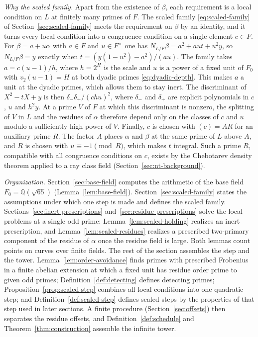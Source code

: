 \documentclass[11pt]{article}
\theoremstyle{plain}
\theoremstyle{definition}
\theoremstyle{remark}
\newcommand{\Q}{\mathbb Q}
\begin{document}
\emph{Why the scaled family.}  Apart from the existence of $\beta$, each
requirement is a local condition on $L$ at finitely many primes of $F$.  The
scaled family \eqref{eq:scaled-family} of Section~\ref{sec:scaled-family}
meets the requirement on $\beta$ by an identity, and it turns every local
condition into a congruence condition on a single element $c\in F$.  For
$\beta=a+u\alpha$ with $a\in F$ and $u\in F^\times$ one has
$N_{L/F}\beta=a^2+aut+u^2y$, so $N_{L/F}\beta=y$ exactly when
$t=(y(1-u^2)-a^2)/(au)$.  The family takes $a=c(u-1)/h$, where $h=2^H$ is
the scale and $u$ is a power of a fixed unit of $F_0$ with $v_2(u-1)=H$ at
both dyadic primes \eqref{eq:dyadic-depth}.  This makes $a$ a unit at the
dyadic primes, which allows them to stay inert.  The discriminant of
$X^2-tX+y$ is then $\delta_-\delta_+/(chu)^2$, where $\delta_-$ and
$\delta_+$ are explicit polynomials in $c$, $u$ and $h^2y$.  At a prime $V$
of $F$ at which this discriminant is nonzero, the splitting of $V$ in $L$
and the residues of $\alpha$ therefore depend only on the classes of $c$
and $u$ modulo a sufficiently high power of $V$.  Finally, $c$ is chosen
with $(c)=AR$ for an auxiliary prime $R$.  The factor $A$ places $\alpha$
and $\beta$ at the same prime of $L$ above $A$, and $R$ is chosen with
$u\equiv-1\pmod R$, which makes $t$ integral.  Such a prime $R$, compatible
with all congruence conditions on $c$, exists by the Chebotarev density
theorem applied to a ray class field (Section~\ref{sec:nt-background}).

\emph{Organization.}  Section~\ref{sec:base-field} computes the arithmetic
of the base field $F_0=\Q(\sqrt{65})$ (Lemma~\ref{lem:base-field}).
Section~\ref{sec:scaled-family} states the assumptions under which one
step is made and defines the scaled family.
Sections~\ref{sec:inert-prescriptions} and~\ref{sec:residue-prescriptions}
solve the local problems at a single odd prime:
Lemma~\ref{lem:scaled-holding} realizes an inert prescription, and
Lemma~\ref{lem:scaled-residues} realizes a prescribed two-primary
component of the residue of $\alpha$ once the residue field is large.
Both lemmas count points on curves over finite fields.  The rest of the
section assembles the step and the tower.
Lemma~\ref{lem:order-avoidance} finds primes with prescribed Frobenius in
a finite abelian extension at which a fixed unit has residue order prime
to given odd primes;
Definition~\ref{def:detecting} defines detecting primes;
Proposition~\ref{prop:scaled-step} combines all local conditions into one
quadratic step; and Definition~\ref{def:scaled-step} defines scaled steps
by the properties of that step used in later sections.  A finite procedure
(Section~\ref{sec:offsets}) then separates the residue offsets, and Definition~\ref{def:schedule} and
Theorem~\ref{thm:construction} assemble the infinite tower.
\end{document}
